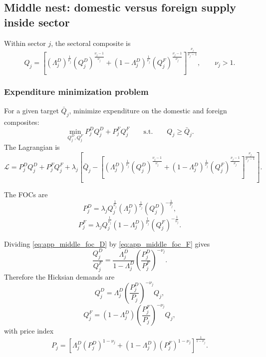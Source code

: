 \subsection{Middle nest: domestic versus foreign supply inside sector}

Within sector $j$, the sectoral composite is
\[
Q_j =
\left[
(\Lambda_j^D)^{\frac{1}{\nu_j}} (Q_j^D)^{\frac{\nu_j-1}{\nu_j}}
+
(1-\Lambda_j^D)^{\frac{1}{\nu_j}} (Q_j^F)^{\frac{\nu_j-1}{\nu_j}}
\right]^{\frac{\nu_j}{\nu_j-1}},
\qquad \nu_j > 1.
\]

\subsubsection{Expenditure minimization problem}

For a given target $\bar{Q}_j$, minimize expenditure on the domestic and foreign composites:
\[
\min_{Q_j^D,Q_j^F}
P_j^D Q_j^D + P_j^F Q_j^F
\qquad \text{s.t.} \qquad
Q_j \geq \bar{Q}_j.
\]
The Lagrangian is
\[
\mathcal{L}
=
P_j^D Q_j^D + P_j^F Q_j^F
+
\lambda_j
\left[
\bar{Q}_j
-
\left[
(\Lambda_j^D)^{\frac{1}{\nu_j}} (Q_j^D)^{\frac{\nu_j-1}{\nu_j}}
+
(1-\Lambda_j^D)^{\frac{1}{\nu_j}} (Q_j^F)^{\frac{\nu_j-1}{\nu_j}}
\right]^{\frac{\nu_j}{\nu_j-1}}
\right].
\]

The FOCs are
\begin{equation}
P_j^D
=
\lambda_j Q_j^{\frac{1}{\nu_j}}
(\Lambda_j^D)^{\frac{1}{\nu_j}}
(Q_j^D)^{-\frac{1}{\nu_j}},
\label{eq:app_middle_foc_D}
\end{equation}
\begin{equation}
P_j^F
=
\lambda_j Q_j^{\frac{1}{\nu_j}}
(1-\Lambda_j^D)^{\frac{1}{\nu_j}}
(Q_j^F)^{-\frac{1}{\nu_j}}.
\label{eq:app_middle_foc_F}
\end{equation}

Dividing \eqref{eq:app_middle_foc_D} by \eqref{eq:app_middle_foc_F} gives
\[
\frac{Q_j^D}{Q_j^F}
=
\frac{\Lambda_j^D}{1-\Lambda_j^D}
\left( \frac{P_j^D}{P_j^F} \right)^{-\nu_j}.
\]
Therefore the Hicksian demands are
\begin{equation}
Q_j^D = \Lambda_j^D \left( \frac{P_j^D}{P_j} \right)^{-\nu_j} Q_j,
\label{eq:app_middle_demand_D}
\end{equation}
\begin{equation}
Q_j^F = (1-\Lambda_j^D) \left( \frac{P_j^F}{P_j} \right)^{-\nu_j} Q_j,
\label{eq:app_middle_demand_F}
\end{equation}
with price index
\begin{equation}
P_j =
\left[
\Lambda_j^D (P_j^D)^{1-\nu_j}
+
(1-\Lambda_j^D) (P_j^F)^{1-\nu_j}
\right]^{\frac{1}{1-\nu_j}}.
\label{eq:app_middle_price_index}
\end{equation}

